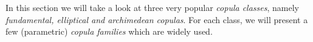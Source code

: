 
In this section we will take a look at three very popular \textit{copula classes}, namely \textit{fundamental, elliptical and archimedean copulas}. For each class, we will present a few (parametric) \textit{copula families} which are widely used.